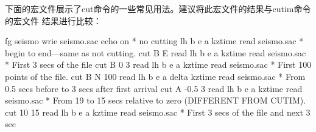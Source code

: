下面的宏文件展示了cut命令的一些常见用法。建议将此宏文件的结果与cutim命令的宏文件
结果进行比较：
\begin{SACCode}
fg seismo 
wrie seismo.sac                                                                
echo on                                                                        
* no cutting                                                                   
lh b e a kztime                                                                
read seismo.sac                                                                
* begin to end---same as not cutting.                                          
cut B E                                                                        
read                                                                           
lh b e a kztime                                                                
read seismo.sac                                                                
* First 3 secs of the file                                                     
cut B 0 3                                                                      
read                                                                           
lh b e a kztime                                                                
read seismo.sac                                                                
* First 100 points of the file.                                                
cut B N 100                                                                    
read                                                                           
lh b e a delta kztime                                                          
read seismo.sac                                                                
* From 0.5 secs before to 3 secs after first arrival                           
cut A -0.5 3                                                                   
read                                                                           
lh b e a kztime                                                                
read seismo.sac                                                                
* From 19 to 15 secs relative to zero (DIFFERENT FROM CUTIM).                  
cut 10 15                                                                      
read                                                                           
lh b e a kztime                                                                
read seismo.sac                                                                
* First 3 secs of the file and next 3 sec                                      

\end{SACCode}
